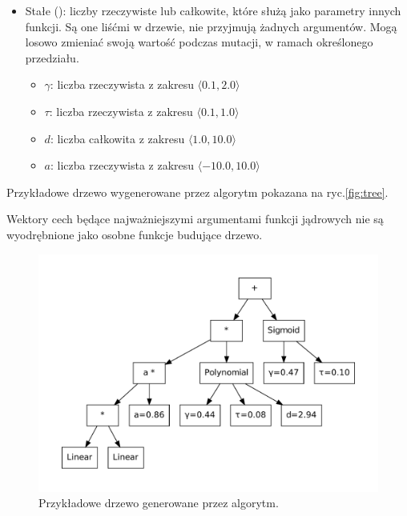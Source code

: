 \begin{itemize}
\item \label{def:erc}Stałe  (): liczby rzeczywiste lub całkowite, które służą jako parametry innych funkcji. Są one liśćmi w drzewie, nie przyjmują żadnych argumentów. Mogą losowo zmieniać swoją wartość podczas mutacji, w ramach określonego przedziału.
	\begin{itemize}
	\item $ \gamma $: liczba rzeczywista z zakresu $ \langle 0.1, 2.0 \rangle $
	\item $ \tau $: liczba rzeczywista z zakresu $ \langle 0.1, 1.0 \rangle $
	\item $ d $: liczba całkowita z zakresu $ \langle 1.0, 10.0 \rangle $
	\item $ a $: liczba rzeczywista z zakresu $ \langle -10.0, 10.0 \rangle $
	\end{itemize}
\end{itemize}
Przykładowe drzewo wygenerowane przez algorytm pokazana na ryc.\ref{fig:tree}.

Wektory cech będące najważniejszymi argumentami funkcji jądrowych nie są wyodrębnione jako osobne funkcje budujące drzewo.

\begin{figure}[h]
\centering
\includegraphics[scale=0.6]{figures/graphs/3-tree}
\caption{Przykładowe drzewo generowane przez algorytm.\label{fig:3-tree}}
\end{figure}


